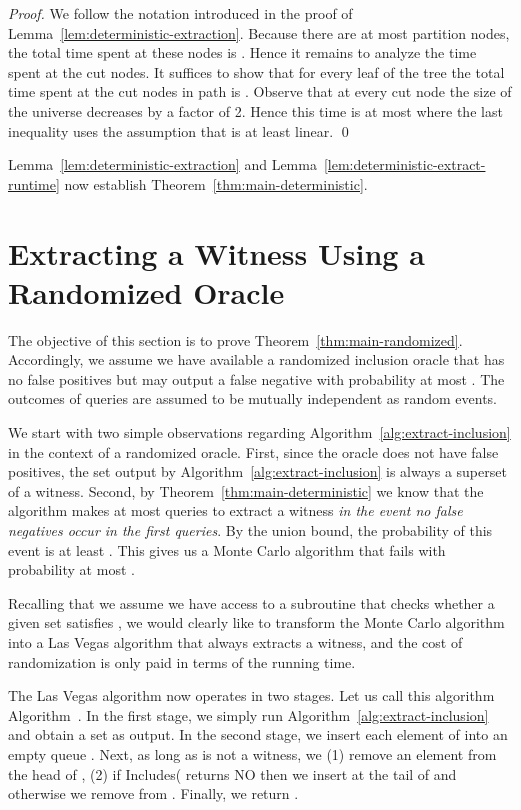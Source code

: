 \documentclass[11pt]{article}
\begin{document}
\begin{proof}
We follow the notation introduced in the proof of Lemma~\ref{lem:deterministic-extraction}. Because there are at most  partition nodes, the total time spent at these nodes is . Hence it remains to analyze the time spent at the cut nodes. It suffices to show that for every leaf  of the tree  the total time spent at the cut nodes in path  is . Observe that at every cut node the size of the universe decreases by a factor of 2. Hence this time is at most  where the last inequality uses the assumption that  is at least linear. \qed
\end{proof}

Lemma~\ref{lem:deterministic-extraction} and 
Lemma~\ref{lem:deterministic-extract-runtime}
now establish Theorem~\ref{thm:main-deterministic}.



\section{Extracting a Witness Using a Randomized Oracle}
\label{sect:randomized}

The objective of this section is to prove Theorem~\ref{thm:main-randomized}. Accordingly, we assume we have available a randomized inclusion oracle that has no false positives but may output a false negative with probability at most . The outcomes of queries are assumed to be mutually independent as random events.

We start with two simple observations regarding Algorithm~\ref{alg:extract-inclusion} in the context of a randomized oracle. First, since the oracle does not have false positives, the set  output by Algorithm~\ref{alg:extract-inclusion} is always a superset of a witness. Second, by Theorem~\ref{thm:main-deterministic} we know that the algorithm makes at most  queries to extract a witness {\em in the event no false negatives occur in the first  queries}. By the union bound, the probability of this event is at least . This gives us a Monte Carlo algorithm that fails with probability at most . 

Recalling that we assume we have access to a subroutine that checks whether a given set  satisfies , we would clearly like to transform the Monte Carlo algorithm into a Las Vegas algorithm that always extracts a witness, and the cost of randomization is only paid in terms of the running time. 

\makeatletter
The Las Vegas algorithm now operates in two stages. Let us call this algorithm Algorithm~\arabic{\algocf@float}\label{alg:second}. In the first stage, we simply run Algorithm~\ref{alg:extract-inclusion} and obtain a set  as output. In the second stage, we insert each element of  into an empty queue . Next, as long as  is not a witness, we (1) remove an element  from the head of , (2) if {\sc Includes}( returns NO then we insert  at the tail of  and otherwise we remove  from . Finally, we return . 
\makeatother
\end{document}
